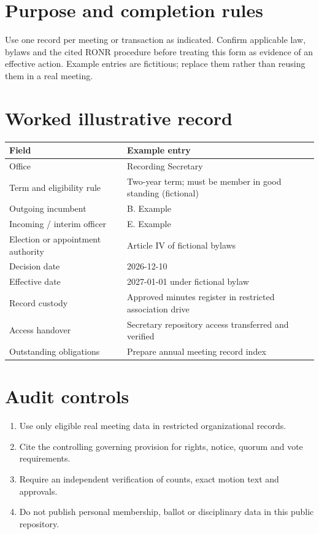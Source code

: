 \documentclass[11pt]{article}
\begin{document}
\SuiteOpen
\section{Purpose and completion rules}
Use one record per meeting or transaction as indicated. Confirm applicable law, bylaws and the cited RONR procedure before treating this form as evidence of an effective action. Example entries are fictitious; replace them rather than reusing them in a real meeting.

\section{Worked illustrative record}
\begin{longtable}{@{}p{.38\linewidth}p{.55\linewidth}@{}}\toprule Field & Example entry\\\midrule\endhead


Office & Recording Secretary\\
Term and eligibility rule & Two-year term; must be member in good standing (fictional)\\
Outgoing incumbent & B. Example\\
Incoming / interim officer & E. Example\\
Election or appointment authority & Article IV of fictional bylaws\\
Decision date & 2026-12-10\\
Effective date & 2027-01-01 under fictional bylaw\\
Record custody & Approved minutes register in restricted association drive\\
Access handover & Secretary repository access transferred and verified\\
Outstanding obligations & Prepare annual meeting record index\\
\bottomrule\end{longtable}
\section{Audit controls}
\begin{enumerate}[leftmargin=*,itemsep=4pt]
\item Use only eligible real meeting data in restricted organizational records.
\item Cite the controlling governing provision for rights, notice, quorum and vote requirements.
\item Require an independent verification of counts, exact motion text and approvals.
\item Do not publish personal membership, ballot or disciplinary data in this public repository.
\end{enumerate}
\end{document}
